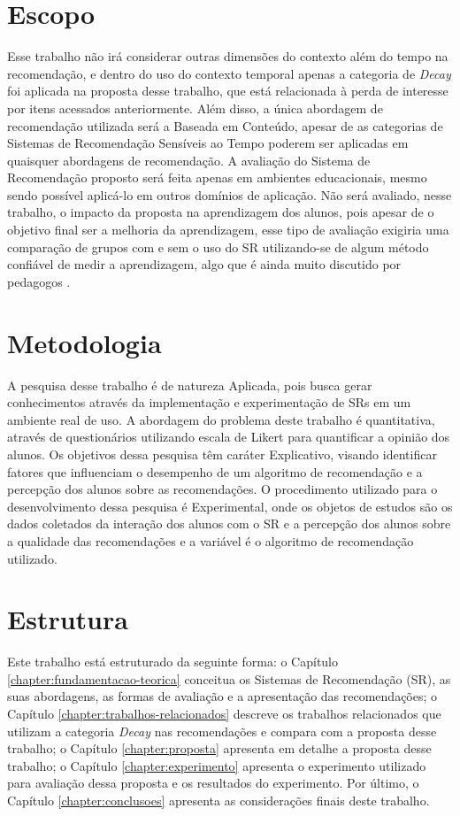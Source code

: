 \section{Escopo}

Esse trabalho não irá considerar outras dimensões do contexto além do tempo na recomendação, e dentro do uso do contexto
temporal apenas a categoria de \textit{Decay} foi aplicada na proposta desse trabalho, que está relacionada à perda de
interesse por itens acessados anteriormente. Além disso, a única abordagem de recomendação utilizada será a Baseada em
Conteúdo, apesar de as categorias de Sistemas de Recomendação Sensíveis ao Tempo poderem ser aplicadas em quaisquer
abordagens de recomendação. A avaliação do Sistema de Recomendação proposto será feita apenas em ambientes educacionais,
mesmo sendo possível aplicá-lo em outros domínios de aplicação. Não será avaliado, nesse trabalho, o impacto da proposta
na aprendizagem dos alunos, pois apesar de o objetivo final ser a melhoria da aprendizagem, esse tipo de avaliação
exigiria uma comparação de grupos com e sem o uso do SR utilizando-se de algum método confiável de medir a
aprendizagem, algo que é ainda muito discutido por pedagogos \cite{luckesi2014avaliaccao}.

\section{Metodologia}

A pesquisa desse trabalho é de natureza Aplicada, pois busca gerar conhecimentos através da implementação e experimentação
de SRs em um ambiente real de uso. A abordagem do problema deste trabalho é quantitativa, através de questionários utilizando
escala de Likert para quantificar a opinião dos alunos. Os objetivos dessa pesquisa têm caráter Explicativo, visando
identificar fatores que influenciam o desempenho de um algoritmo de recomendação e a percepção dos alunos sobre as
recomendações. O procedimento utilizado para o desenvolvimento dessa pesquisa é Experimental, onde os objetos de estudos são
os dados coletados da interação dos alunos com o SR e a percepção dos alunos sobre a qualidade das recomendações e a
variável é o algoritmo de recomendação utilizado.

\section{Estrutura}

Este trabalho está estruturado da seguinte forma: o Capítulo \ref{chapter:fundamentacao-teorica} conceitua os Sistemas de
Recomendação (SR), as suas abordagens, as formas de avaliação e a apresentação das recomendações; o Capítulo \ref{chapter:trabalhos-relacionados}
descreve os trabalhos relacionados que utilizam a categoria \textit{Decay} nas recomendações e compara com a proposta desse
trabalho; o Capítulo \ref{chapter:proposta} apresenta em detalhe a proposta desse trabalho; o Capítulo \ref{chapter:experimento}
apresenta o experimento utilizado para avaliação dessa proposta e os resultados do experimento. Por último, o Capítulo \ref{chapter:conclusoes} apresenta
as considerações finais deste trabalho.


